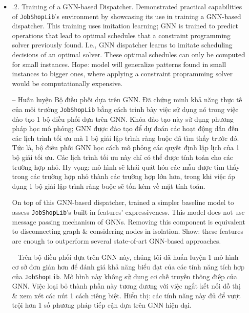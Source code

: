 \documentclass{article}
\begin{document}
\begin{itemize}
\begin{itemize}
\begin{itemize}
            \item {.2. Training of a GNN-based Dispatcher.} Demonstrated practical capabilities of {\tt JobShopLib}'s environment by showcasing its use in training a GNN-based dispatcher. This training uses imitation learning; GNN is trained to predict operations that lead to optimal schedules that a constraint programming solver previously found. I.e., GNN dispatcher learns to imitate scheduling decisions of an optimal solver. These optimal schedules can only be computed for small instances. Hope: model will generalize patterns found in small instances to bigger ones, where applying a constraint propramming solver would be computationally expensive.

            -- {\sf  Huấn luyện Bộ điều phối dựa trên GNN.} Đã chứng minh khả năng thực tế của môi trường {\tt JobShopLib} bằng cách trình bày việc sử dụng nó trong việc đào tạo 1 bộ điều phối dựa trên GNN. Khóa đào tạo này sử dụng phương pháp học mô phỏng; GNN được đào tạo để dự đoán các hoạt động dẫn đến các lịch trình tối ưu mà 1 bộ giải lập trình ràng buộc đã tìm thấy trước đó. Tức là, bộ điều phối GNN học cách mô phỏng các quyết định lập lịch của 1 bộ giải tối ưu. Các lịch trình tối ưu này chỉ có thể được tính toán cho các trường hợp nhỏ. Hy vọng: mô hình sẽ khái quát hóa các mẫu được tìm thấy trong các trường hợp nhỏ thành các trường hợp lớn hơn, trong khi việc áp dụng 1 bộ giải lập trình ràng buộc sẽ tốn kém về mặt tính toán.

            On top of this GNN-based dispatcher, trained a simpler baseline model to assess {\tt JobShopLib}'s built-in features' expressiveness. This model does not use message passing mechanism of GNNs. Removing this component is equivalent to disconnecting graph \& considering nodes in isolation. Show: these features are enough to outperform several state-of-art GNN-based approaches.

            -- Trên bộ điều phối dựa trên GNN này, chúng tôi đã huấn luyện 1 mô hình cơ sở đơn giản hơn để đánh giá khả năng biểu đạt của các tính năng tích hợp của {\tt JobShopLib}. Mô hình này không sử dụng cơ chế truyền thông điệp của GNN. Việc loại bỏ thành phần này tương đương với việc ngắt kết nối đồ thị \& xem xét các nút 1 cách riêng biệt. Hiển thị: các tính năng này đủ để vượt trội hơn 1 số phương pháp tiếp cận dựa trên GNN hiện đại.


\end{itemize}
\end{itemize}
\end{itemize}
\end{document}
